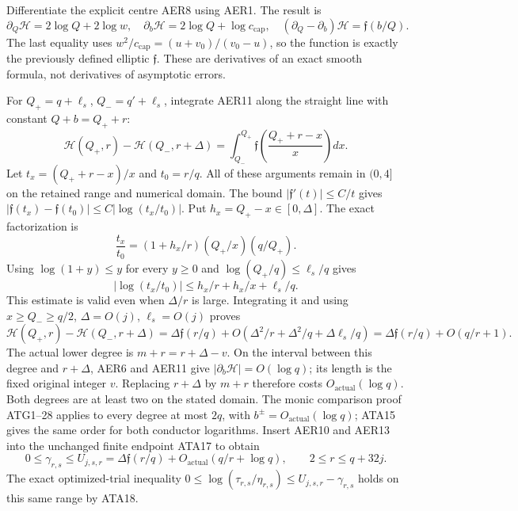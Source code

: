 \documentclass[11pt,a4paper]{article}
\begin{document}
Differentiate the explicit centre AER8 using AER1.  The result is
\[
 \partial_Q\mathcal H=2\log Q+2\log w,\quad
 \partial_b\mathcal H=2\log Q+\log c_{\mathrm{cap}},\quad
 (\partial_Q-\partial_b)\mathcal H=\mathfrak f(b/Q).
                                                               \tag{AER11}
\]
The last equality uses
$w^2/c_{\mathrm{cap}}=(u+v_0)/(v_0-u)$, so the function is exactly
the previously defined elliptic $\mathfrak f$.  These are derivatives
of an exact smooth formula, not derivatives of asymptotic errors.

For $Q_+=q+\ell_s$, $Q_-=q'+\ell_s$, integrate AER11 along the
straight line with constant $Q+b=Q_++r$:
\[
 \mathcal H(Q_+,r)-\mathcal H(Q_-,r+\Delta)
 =\int_{Q_-}^{Q_+}
       \mathfrak f\left(\frac{Q_++r-x}{x}\right)dx.      \tag{AER12}
\]
Let $t_x=(Q_++r-x)/x$ and $t_0=r/q$.  All of these arguments
remain in $(0,4]$ on the retained range and numerical domain.
The bound $|\mathfrak f'(t)|\le C/t$ gives
$|\mathfrak f(t_x)-\mathfrak f(t_0)|\le C|\log(t_x/t_0)|$.
Put $h_x=Q_+-x\in[0,\Delta]$.  The exact factorization is
\[
 \frac{t_x}{t_0}=
       (1+h_x/r)(Q_+/x)(q/Q_+).
\]
Using $\log(1+y)\le y$ for every $y\ge0$ and
$\log(Q_+/q)\le\ell_s/q$ gives
\[
 |\log(t_x/t_0)|\le h_x/r+h_x/x+\ell_s/q.
\]
This estimate is valid even when $\Delta/r$ is large.  Integrating
it and using $x\ge Q_-\ge q/2$, $\Delta=O(j)$,
$\ell_s=O(j)$ proves
\[
 \mathcal H(Q_+,r)-\mathcal H(Q_-,r+\Delta)
 =\Delta\mathfrak f(r/q)
       +O(\Delta^2/r+\Delta^2/q+\Delta\ell_s/q)
 =\Delta\mathfrak f(r/q)+O(q/r+1).                     \tag{AER13}
\]
The actual lower degree is $m+r=r+\Delta-v$.
On the interval between this degree and $r+\Delta$, AER6 and
AER11 give $|\partial_b\mathcal H|=O(\log q)$; its length is the
fixed original integer $v$.  Replacing $r+\Delta$ by $m+r$
therefore costs $O_{\mathrm{actual}}(\log q)$.
Both degrees are at least two on the stated domain.
The monic comparison proof ATG1--28 applies to every degree at most
$2q$, with $b^\pm=O_{\mathrm{actual}}(\log q)$; ATA15 gives the same
order for both conductor logarithms.  Insert AER10 and AER13 into
the unchanged finite endpoint ATA17 to obtain
\[
 \boxed{\quad
 0\le\gamma_{r,s}\le U_{j,s,r}
       =\Delta\mathfrak f(r/q)+O_{\mathrm{actual}}(q/r+\log q),
 \qquad 2\le r\le q+32j.
 \quad}                                                \tag{AER14}
\]
The exact optimized-trial inequality
$0\le\log(\tau_{r,s}/\eta_{r,s})\le U_{j,s,r}-\gamma_{r,s}$
holds on this same range by ATA18.
\end{document}
